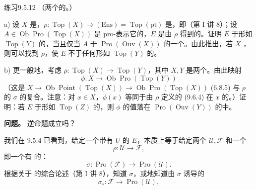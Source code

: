 \begin{SGAresult}{练习}{9.5.12}
（两个的。）

a) 设 $X$ 是，$\rho:\operatorname{Top}(X)\to(\mathrm{Ens})=\operatorname{Top}(\mathrm{pt})$ 是，即（第 I 讲 8）；设 $A\in\operatorname{Ob}\operatorname{Pro}(\operatorname{Top}(X))$ 是 pro-表示它的，$E$ 是由 $\rho$ 得到的。证明 $E$ 于形如 $\operatorname{Top}(Y)$ 的，当且仅当 $A$ 于 $\operatorname{Pro}(\operatorname{Ouv}(X))$ 的一个。由此推出，若 $X$ ，则可以找到 $\rho$，使 $E$ 不于任何形如 $\operatorname{Top}(Y)$ 的。

b) 更一般地，考虑 $\rho:\operatorname{Top}(X)\to\operatorname{Top}(Y)$，其中 $X,Y$ 是两个。由此映射
\[
\phi:X\longrightarrow\operatorname{Ob}\operatorname{Pro}(\operatorname{Top}(Y))
\]
（这是 $X\to\operatorname{Ob}\operatorname{Point}(\operatorname{Top}(X))\to\operatorname{Ob}\operatorname{Pro}(\operatorname{Top}(X))$ (6.8.5) 与 $\rho$ 的  $\sigma$ 的复合。注意：对 $x\in X$，$\phi(x)$ 等同于由 $\rho$ 定义的 (9.6.4) 在 $x$ 的。）证明：若 $E$ 于形如 $\operatorname{Top}(Z)$ 的，则 $\phi$ 的值落在 $\operatorname{Pro}(\operatorname{Ouv}(Y))$ 的中。

\textbf{问题。} 逆命题成立吗？
\end{SGAresult}
我们在 9.5.4 已看到，给定一个带有 $U$ 的 $E$，本质上等于给定两个 $\mathscr U,\mathscr F$ 和一个
\[
\rho:\mathscr U\longrightarrow\mathscr F,\tag{9.6.1}
\]
即一个有 的：
\[
\sigma:\operatorname{Pro}(\mathscr F)\longrightarrow\operatorname{Pro}(\mathscr U).\tag{9.6.2}
\]
根据关于 的综合论述（第 I 讲 8），知道 $\sigma$，或地知道由 $\sigma$ 诱导的
\[
\sigma_\circ:\mathscr F\longrightarrow\operatorname{Pro}(\mathscr U),\tag{9.6.3}
\]
